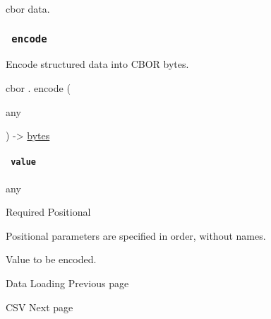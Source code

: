 cbor data.

\subsubsection{\texorpdfstring{\texttt{\ encode\ }}{ encode }}\label{definitions-encode}

Encode structured data into CBOR bytes.

cbor { . } { encode } (

{ { any } }

) -\textgreater{} \href{/docs/reference/foundations/bytes/}{bytes}

\paragraph{\texorpdfstring{\texttt{\ value\ }}{ value }}\label{definitions-encode-value}

{ any }

{Required} {{ Positional }}

\label{definitions-encode-value-positional-tooltip}
Positional parameters are specified in order, without names.

Value to be encoded.

\href{/docs/reference/data-loading/}{\pandocbounded{}}

{ Data Loading } { Previous page }

\href{/docs/reference/data-loading/csv/}{\pandocbounded{}}

{ CSV } { Next page }
